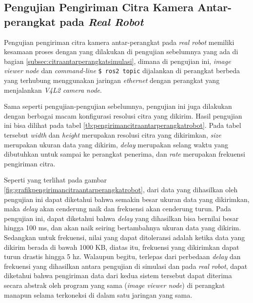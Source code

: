 \subsection{Pengujian Pengiriman Citra Kamera Antar-perangkat pada \emph{Real Robot}}
\label{subsec:citraantarperangkatrobot}

Pengujian pengiriman citra kamera antar-perangkat pada \emph{real robot} memiliki kesamaan proses dengan yang dilakukan di pengujian sebelumnya yang ada di bagian \ref{subsec:citraantarperangkatsimulasi},
  dimana di pengujian ini, \emph{image viewer node} dan \emph{command-line} \lstinline{$ ros2 topic} dijalankan di perangkat berbeda yang terhubung menggunakan jaringan \emph{ethernet} dengan perangkat yang menjalankan \emph{V4L2 camera node}.

Sama seperti pengujian-pengujian sebelumnya,
  pengujian ini juga dilakukan dengan berbagai macam konfigurasi resolusi citra yang dikirim.
Hasil pengujian ini bisa dilihat pada tabel \ref{tb:pengirimancitraantarperangkatrobot}.
Pada tabel tersebut \emph{width} dan \emph{height} merupakan resolusi citra yang dikirimkan,
  \emph{size} merupakan ukuran data yang dikirim,
  \emph{delay} merupakan selang waktu yang dibutuhkan untuk sampai ke perangkat penerima,
  dan \emph{rate} merupakan frekuensi pengiriman citra.





Seperti yang terlihat pada gambar \ref{fig:grafikpengirimancitraantarperangkatrobot},
  dari data yang dihasilkan oleh pengujian ini dapat diketahui bahwa semakin besar ukuran data yang dikirimkan,
  maka \emph{delay} akan cenderung naik dan frekuensi akan cenderung turun.
Pada pengujian ini, dapat diketahui bahwa \emph{delay} yang dihasilkan bisa bernilai besar hingga 100 ms,
  dan akan naik seiring bertambahnya ukuran data yang dikirim.
Sedangkan untuk frekuensi,
  nilai yang dapat ditoleransi adalah ketika data yang dikirim berada di bawah 1000 KB,
  diatas itu, frekuensi yang dikirimkan dapat turun drastis hingga 5 hz.
Walaupun begitu, terlepas dari perbedaan \emph{delay} dan frekuensi yang dihasilkan antara pengujian di simulasi dan pada \emph{real robot},
  dapat diketahui bahwa pengiriman data dari kedua sistem tersebut dapat diterima secara abstrak oleh program yang sama (\emph{image viewer node}) di perangkat manapun selama terkoneksi di dalam satu jaringan yang sama.
